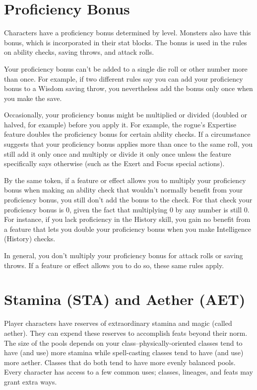 \section{Proficiency Bonus}

Characters have a proficiency bonus determined by level. Monsters also have this bonus, which is incorporated in their stat blocks. The bonus is used in the rules on ability checks, saving throws, and attack rolls.

Your proficiency bonus can't be added to a single die roll or other number more than once. For example, if two different rules say you can add your proficiency bonus to a Wisdom saving throw, you nevertheless add the bonus only once when you make the save.

Occasionally, your proficiency bonus might be multiplied or divided (doubled or halved, for example) before you apply it. For example, the rogue's Expertise feature doubles the proficiency bonus for certain ability checks. If a circumstance suggests that your proficiency bonus applies more than once to the same roll, you still add it only once and multiply or divide it only once unless the feature specifically says otherwise (such as the Exert and Focus special actions).

By the same token, if a feature or effect allows you to multiply your proficiency bonus when making an ability check that wouldn't normally benefit from your proficiency bonus, you still don't add the bonus to the check. For that check your proficiency bonus is 0, given the fact that multiplying 0 by any number is still 0. For instance, if you lack proficiency in the History skill, you gain no benefit from a feature that lets you double your proficiency bonus when you make Intelligence (History) checks.

In general, you don't multiply your proficiency bonus for attack rolls or saving throws. If a feature or effect allows you to do so, these same rules apply.

\section{Stamina (STA) and Aether (AET)}\label{sec:stamina-and-aether}
Player characters have reserves of extraordinary stamina and magic (called aether). They can expend these reserves to accomplish feats beyond their norm. The size of the pools depends on your class–physically-oriented classes tend to have (and use) more stamina while spell-casting classes tend to have (and use) more aether. Classes that do both tend to have more evenly balanced pools. Every character has access to a few common uses; classes, lineages, and feats may grant extra ways.

